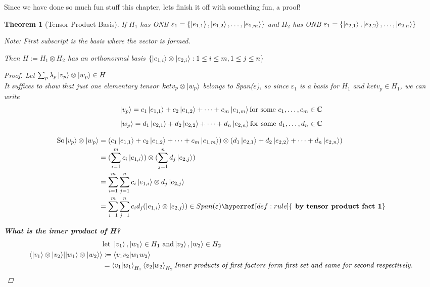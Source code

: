 \documentclass[12pt]{article}
\theoremstyle{plain}
\newtheorem{theorem}[lemma]{Theorem}
\theoremstyle{nonumberplain}
\theoremstyle{plain}
\theoremstyle{nonumberplain}
\newtheorem{proof}{Proof.}
\newcommand\1{{\bf 1}}
\newcommand{\C}{\mathbb{C}} %
\newcommand{\<}{\left\langle}
\renewcommand{\>}{\right\rangle}
\begin{document}
\pagebreak
Since we have done so much fun stuff this chapter, lets finish it off with something fun, a proof!
\begin{theorem} [Tensor Product Basis]\leavevmode\linebreak
If $H_1$ has ONB $\varepsilon_1 = \{\ket{e_{1,1}}, \ket{e_{1,2}}, \dots, \ket{e_{1,m}}\}$ and $H_2$ has ONB $\varepsilon_1 = \{\ket{e_{2,1}}, \ket{e_{2,2}}, \dots, \ket{e_{2,n}}\}$
\begin{center}
\textit{Note: First subscript is the basis where the vector is formed.}\\
\end{center}
Then $H := H_1 \otimes H_2$ has an orthonormal basis $\{\ket{e_{1,i}} \otimes \ket{e_{2,i}} : 1 \leq i \leq m, 1 \leq j \leq n \}$
\begin{proof} Let $\sum_p \lambda_p \ket{v_p} \otimes \ket{w_p} \in H$\\
It suffices to show that just one elementary tensor $ket{v_p} \otimes \ket{w_p}$ belongs to Span($\varepsilon$), so since $\varepsilon_1$ is a basis for $H_1$ and $ket{v_p} \in H_1$, we can write 
\begin{equation*}
\ket{v_p} = c_1\ket{e_{1,1}} + c_2\ket{e_{1,2}} + \dots + c_m\ket{e_{1,m}} \text{for some } c_1, \dots, c_m \in \C  
\end{equation*}
\begin{equation*}
\ket{w_p} = d_1\ket{e_{2,1}} + d_2\ket{e_{2,2}} + \dots + d_n\ket{e_{2,n}} \text{for some } d_1, \dots, d_n \in \C  
\end{equation*}

\begin{align*}
\text{So} \ket{v_p} \otimes \ket{w_p} &= (c_1\ket{e_{1,1}} + c_2\ket{e_{1,2}} + \dots + c_m\ket{e_{1,m}}) \otimes (d_1\ket{e_{2,1}} + d_2\ket{e_{2,2}} + \dots + d_n\ket{e_{2,n}})\\
&= (\sum_{i=1}^{m} c_i\ket{e_{1,i}}) \otimes (\sum_{j=1}^{n} d_j\ket{e_{2,j}})\\
&= \sum_{i=1}^{m}\sum_{j=1}^{n} c_i\ket{e_{1,i}} \otimes d_j\ket{e_{2,j}}\\
&= \sum_{i=1}^{m}\sum_{j=1}^{n} c_i d_j (\ket{e_{1,i}} \otimes \ket{e_{2,j}}) \in Span(\varepsilon) \hyperref[def:rule]{\textbf{ by tensor product fact 1}}\\
\end{align*}

\textbf{What is the inner product of H?}\\
\begin{align*}
&\text{let } \ket{v_1}, \ket{w_1} \in H_1 \text{ and} \ket{v_2}, \ket{w_2} \in H_2\\
\braket{{\ket{v_1} \otimes \ket{v_2}}|{\ket{w_1} \otimes \ket{w_2}}} &\coloneqq \braket{v_1v_2|w_1w_2}\\
&= \braket{v_1|w_1}_{H_1} \braket{v_2|w_2}_{H_2} \textit{Inner products of first factors form first set and same for second respectively.}
\end{align*}


\end{proof}
\end{theorem}
\end{document}

